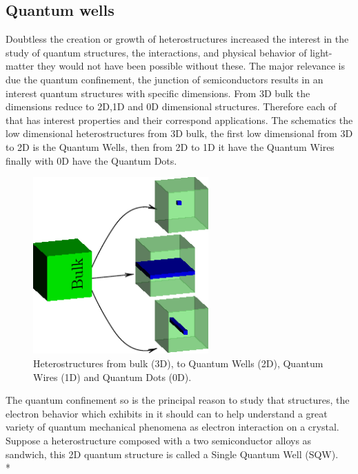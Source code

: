\subsection{Quantum wells}
\label{subsection:chapter-1-quantum-wells}
\vspace{-10mm} 
Doubtless the creation or growth of heterostructures increased the interest in the study of quantum structures, the interactions, and physical behavior of light-matter they would not have been possible without these.  The major relevance is due the quantum confinement, the junction of semiconductors results in an interest quantum structures with specific dimensions. From 3D bulk the dimensions reduce to 2D,1D and 0D dimensional structures. Therefore each of that has interest properties and their correspond applications. The  schematics the low dimensional heterostructures from 3D bulk, the first low dimensional from 3D to 2D  is the Quantum Wells, then from 2D to 1D it have the Quantum Wires finally with 0D have the Quantum Dots.
\begin{figure}
	\centering
	\includegraphics[width=0.6\textwidth]{../figures/chapter-1/heterostructures/out/lds-00}
	\caption{Heterostructures from bulk (3D), to Quantum Wells (2D), Quantum Wires (1D) and Quantum Dots (0D).  }
	\label{fig:subsection-1.2-heterostructures}
\end{figure}
The quantum confinement so is the principal reason to study that structures, the electron behavior which exhibits in it  should  can to help  understand  a great variety of quantum mechanical phenomena as electron interaction on a crystal. 
Suppose a heterostructure composed with a two semiconductor alloys as sandwich, this 2D quantum structure is called a Single Quantum Well (SQW). \\*
